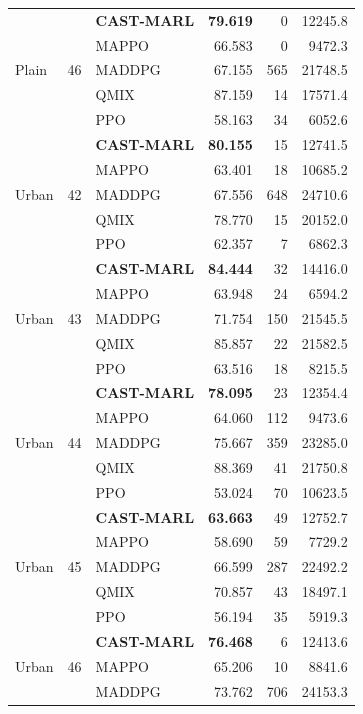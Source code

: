 \begin{longtable}{lllrrr}
\midrule
\multirow{5}{*}{Plain} & \multirow{5}{*}{46} & \textbf{CAST-MARL} & \textbf{79.619} & 0 & 12245.8 \\
 &  & MAPPO & 66.583 & 0 & 9472.3 \\
 &  & MADDPG & 67.155 & 565 & 21748.5 \\
 &  & QMIX & 87.159 & 14 & 17571.4 \\
 &  & PPO & 58.163 & 34 & 6052.6 \\
\midrule
\multirow{5}{*}{Urban} & \multirow{5}{*}{42} & \textbf{CAST-MARL} & \textbf{80.155} & 15 & 12741.5 \\
 &  & MAPPO & 63.401 & 18 & 10685.2 \\
 &  & MADDPG & 67.556 & 648 & 24710.6 \\
 &  & QMIX & 78.770 & 15 & 20152.0 \\
 &  & PPO & 62.357 & 7 & 6862.3 \\
\midrule
\multirow{5}{*}{Urban} & \multirow{5}{*}{43} & \textbf{CAST-MARL} & \textbf{84.444} & 32 & 14416.0 \\
 &  & MAPPO & 63.948 & 24 & 6594.2 \\
 &  & MADDPG & 71.754 & 150 & 21545.5 \\
 &  & QMIX & 85.857 & 22 & 21582.5 \\
 &  & PPO & 63.516 & 18 & 8215.5 \\
\midrule
\multirow{5}{*}{Urban} & \multirow{5}{*}{44} & \textbf{CAST-MARL} & \textbf{78.095} & 23 & 12354.4 \\
 &  & MAPPO & 64.060 & 112 & 9473.6 \\
 &  & MADDPG & 75.667 & 359 & 23285.0 \\
 &  & QMIX & 88.369 & 41 & 21750.8 \\
 &  & PPO & 53.024 & 70 & 10623.5 \\
\midrule
\multirow{5}{*}{Urban} & \multirow{5}{*}{45} & \textbf{CAST-MARL} & \textbf{63.663} & 49 & 12752.7 \\
 &  & MAPPO & 58.690 & 59 & 7729.2 \\
 &  & MADDPG & 66.599 & 287 & 22492.2 \\
 &  & QMIX & 70.857 & 43 & 18497.1 \\
 &  & PPO & 56.194 & 35 & 5919.3 \\
\midrule
\multirow{5}{*}{Urban} & \multirow{5}{*}{46} & \textbf{CAST-MARL} & \textbf{76.468} & 6 & 12413.6 \\
 &  & MAPPO & 65.206 & 10 & 8841.6 \\
 &  & MADDPG & 73.762 & 706 & 24153.3 \\

\end{longtable}

